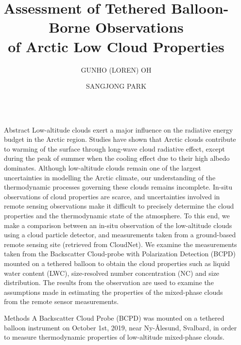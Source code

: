 \documentclass[final]{beamer}
\title{Assessment of Tethered Balloon-Borne Observations \\ of Arctic Low Cloud Properties}
\author{GUNHO (LOREN) OH \inst{1} \and SANGJONG PARK \inst{1}}
\institute[shortinst]{\inst{1} Korean Polar Research Institute (KOPRI)}
\newlength{\sepwidth}
\newlength{\colwidth}
\newcommand{\separatorcolumn}{\begin{column}{\sepwidth}\end{column}}
\begin{document}
\begin{frame}[t]
  \begin{columns}[t]

    \separatorcolumn
    \begin{column}{\colwidth}

      \begin{block}{Abstract}
        Low-altitude clouds exert a major influence on the radiative energy budget in the Arctic region. Studies have shown that Arctic clouds contribute to warming of the surface through long-wave cloud radiative effect, except during the peak of summer when the cooling effect due to their high albedo dominates. Although low-altitude clouds remain one of the largest uncertainties in modelling the Arctic climate, our understanding of the thermodynamic processes governing these clouds remains incomplete. In-situ observations of cloud properties are scarce, and uncertainties involved in remote sensing observations make it difficult to precisely determine the cloud properties and the thermodynamic state of the atmosphere. To this end, we make a comparison between an in-situ observation of the low-altitude clouds using a cloud particle detector, and measurements taken from a ground-based remote sensing site (retrieved from CloudNet). We examine the measurements taken from the Backscatter Cloud-probe with Polarization Detection (BCPD) mounted on a tethered balloon to obtain the cloud properties such as liquid water content (LWC), size-resolved number concentration (NC) and size distribution. The results from the  observation are used to examine the assumptions made in estimating the properties of the mixed-phase clouds from the remote sensor measurements.
      \end{block}

      \begin{block}{Methods}
        A Backscatter Cloud Probe (BCPD) was mounted on a tethered balloon instrument on October 1st, 2019, near Ny-\r{A}lesund, Svalbard, in order to measure thermodynamic properties of low-altitude mixed-phase clouds.


\end{block}
\end{column}
\end{columns}
\end{frame}
\end{document}
